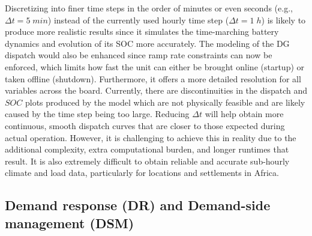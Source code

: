 \documentclass[final,3p,times]{elsarticle}
\begin{document}
Discretizing into finer time steps in the order of minutes or even seconds (e.g., $\Delta t = 5\; min$) instead of the currently used hourly time step ($\Delta t = 1\; h$) is likely to produce more realistic results since it simulates the time-marching battery dynamics and evolution of its SOC more accurately. The modeling of the DG dispatch would also be enhanced since ramp rate constraints can now be enforced, which limits how fast the unit can either be brought online (startup) or taken offline (shutdown). Furthermore, it offers a more detailed resolution for all variables across the board. Currently, there are discontinuities in the dispatch and $SOC$ plots produced by the model which are not physically feasible and are likely caused by the time step being too large. Reducing $\Delta t$ will help obtain more continuous, smooth dispatch curves that are closer to those expected during actual operation. However, it is challenging to achieve this in reality due to the additional complexity, extra computational burden, and longer runtimes that result. It is also extremely difficult to obtain reliable and accurate sub-hourly climate and load data, particularly for locations and settlements in Africa. 

\subsection{\label{sec:dr} Demand response (DR) and Demand-side management (DSM)}
\end{document}
